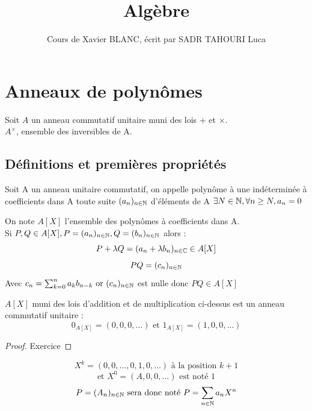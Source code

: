 \documentclass[]{report}
\title{Algèbre}
\author{Cours de Xavier BLANC, écrit par SADR TAHOURI Luca}
\date{}
\begin{document}
    \maketitle
    \tableofcontents

    \chapter{Anneaux de polynômes}

    Soit $A$ un anneau commutatif unitaire muni des lois $+$ et $\times$.\\
    $A^\times$, ensemble des inversibles de A.

    \section{Définitions et premières propriétés}

    \begin{df}{}{}
    Soit A un anneau unitaire commutatif, on appelle polynôme à une indéterminée à coefficients dans A toute suite $(a_n)_{n\in\mathbb{N}}$ d'éléments de A \tq $\exists N\in\mathbb{N},\forall n\ge N, a_n=0$
    \end{df}

    \begin{not}{}{}
    On note $A[X]$ l'ensemble des polynômes à coefficients dans A. \\
    Si $P,Q\in A[X], P=(a_n)_{n\in\mathbb{N}},Q=(b_n)_{n\in\mathbb{N}}$ alors :
    \[P+\lambda Q=(a_n+\lambda b_n)_{n\in\mathbb{C}}\in A[X]\]
    $$PQ=(c_n)_{n\in\mathbb{N}}$$ 
    Avec $c_n=\sum_{k=0}^na_kb_{n-k}\text{ or }(c_n)_{n\in\mathbb{N}}$ est nulle \apcr donc $PQ\in A[X]$
    \end{not}

    \begin{prop}{}{}
        $A[X]$ muni des lois d'addition et de multiplication ci-dessus est un anneau commutatif unitaire :
        $$0_{A[X]}=(0,0,0,\dots)\text{ et }1_{A[X]}=(1,0,0,\dots)$$
    \end{prop}

    \begin{proof}
        Exercice
    \end{proof}

    \begin{not}{}{}
        $$X^k=(0,0,\dots,0,1,0,\dots) \text{ à la position $k+1$}$$
        $$\text{et } X^0=(A,0,0,\dots) \text{ est noté 1}$$
        $$P=(A_n)_{n\in\mathbb{N}}\text{ sera donc noté }P=\sum_{n\in\mathbb{N}}a_nX^n$$
    \end{not}
\end{document}
